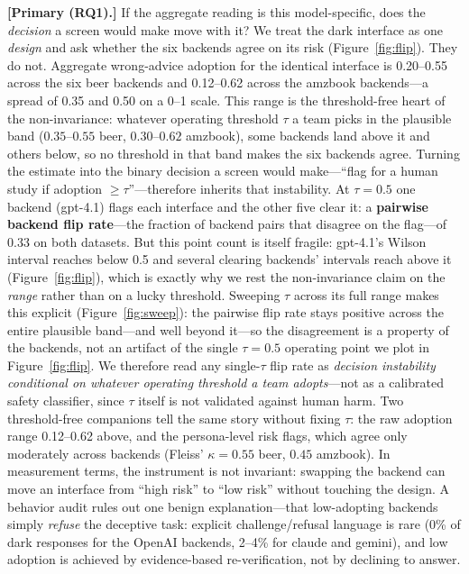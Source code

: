 \documentclass[manuscript,review,anonymous]{acmart}
\begin{document}
\textbf{[Primary (RQ1).]} If the aggregate reading is this model-specific, does the \emph{decision} a screen would make move with it?
We treat the dark interface as one \emph{design} and ask whether the six backends agree on its risk
(Figure~\ref{fig:flip}). They do not. Aggregate wrong-advice adoption for the identical
interface is 0.20--0.55
across the six beer backends and 0.12--0.62 across the amzbook backends---a spread of 0.35 and 0.50 on a
0--1 scale. This range is the threshold-free heart of the non-invariance: whatever operating threshold
$\tau$ a team picks in the plausible band ($0.35$--$0.55$ beer, $0.30$--$0.62$ amzbook), some backends land
above it and others below, so no threshold in that band makes the six backends agree. Turning the estimate
into the binary decision a screen would make---``flag for a human study if adoption $\ge \tau$''---therefore
inherits that instability. At $\tau=0.5$ one backend (gpt-4.1) flags each interface and the other five clear
it: a \textbf{pairwise backend flip rate}---the fraction of backend pairs that disagree on the flag---of
0.33 on both datasets. But this point count is itself fragile: gpt-4.1's Wilson interval reaches below 0.5
and several clearing backends' intervals reach above it (Figure~\ref{fig:flip}), which is exactly why we
rest the non-invariance claim on the \emph{range} rather than on a lucky threshold. Sweeping $\tau$ across
its full range makes this explicit (Figure~\ref{fig:sweep}): the pairwise flip rate stays positive across
the entire plausible band---and well beyond it---so the disagreement is a property of the backends, not an
artifact of the single $\tau=0.5$ operating point we plot in Figure~\ref{fig:flip}. We therefore read any
single-$\tau$ flip rate as \emph{decision instability conditional on whatever operating threshold a team
adopts}---not as a calibrated safety classifier, since $\tau$ itself is not validated against human harm.
Two threshold-free companions tell the same story without fixing $\tau$: the raw adoption range 0.12--0.62
above, and the persona-level risk flags, which agree only moderately across
backends (Fleiss' $\kappa=0.55$ beer, $0.45$ amzbook). In measurement terms, the instrument is not
invariant: swapping the backend can move an interface from ``high risk'' to ``low risk'' without touching
the design. A behavior audit rules out one benign explanation---that low-adopting backends simply
\emph{refuse} the deceptive task: explicit challenge/refusal language is rare (0\% of dark responses for
the OpenAI backends, 2--4\% for claude and gemini), and low adoption is achieved by evidence-based
re-verification, not by declining to answer.
\end{document}
